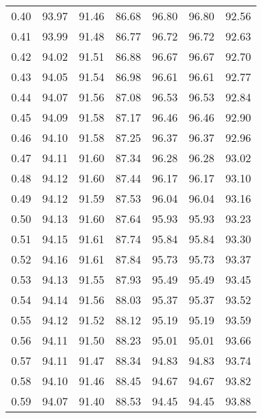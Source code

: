 \begin{tabular}{|c|c|c|c|c|c|c|}
      0.40 &     93.97 &     91.46 &      86.68 &   96.80 &      96.80 &         92.56 \\
      0.41 &     93.99 &     91.48 &      86.77 &   96.72 &      96.72 &         92.63 \\
      0.42 &     94.02 &     91.51 &      86.88 &   96.67 &      96.67 &         92.70 \\
      0.43 &     94.05 &     91.54 &      86.98 &   96.61 &      96.61 &         92.77 \\
      0.44 &     94.07 &     91.56 &      87.08 &   96.53 &      96.53 &         92.84 \\
      0.45 &     94.09 &     91.58 &      87.17 &   96.46 &      96.46 &         92.90 \\
      0.46 &     94.10 &     91.58 &      87.25 &   96.37 &      96.37 &         92.96 \\
      0.47 &     94.11 &     91.60 &      87.34 &   96.28 &      96.28 &         93.02 \\
      0.48 &     94.12 &     91.60 &      87.44 &   96.17 &      96.17 &         93.10 \\
      0.49 &     94.12 &     91.59 &      87.53 &   96.04 &      96.04 &         93.16 \\
      0.50 &     94.13 &     91.60 &      87.64 &   95.93 &      95.93 &         93.23 \\
      0.51 &     94.15 &     91.61 &      87.74 &   95.84 &      95.84 &         93.30 \\
      0.52 &     94.16 &     91.61 &      87.84 &   95.73 &      95.73 &         93.37 \\
      0.53 &     94.13 &     91.55 &      87.93 &   95.49 &      95.49 &         93.45 \\
      0.54 &     94.14 &     91.56 &      88.03 &   95.37 &      95.37 &         93.52 \\
      0.55 &     94.12 &     91.52 &      88.12 &   95.19 &      95.19 &         93.59 \\
      0.56 &     94.11 &     91.50 &      88.23 &   95.01 &      95.01 &         93.66 \\
      0.57 &     94.11 &     91.47 &      88.34 &   94.83 &      94.83 &         93.74 \\
      0.58 &     94.10 &     91.46 &      88.45 &   94.67 &      94.67 &         93.82 \\
      0.59 &     94.07 &     91.40 &      88.53 &   94.45 &      94.45 &         93.88 \\

\end{tabular}
